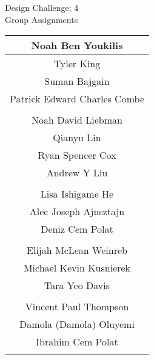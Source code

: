 \documentclass{article}
\begin{document}
\renewcommand{\arraystretch}{1.2} 
\begin{center}
{\Large Design Challenge: 4\\ 
Group Assignments} \\ 
\begin{tabular}{|c|} \hline 
Noah Ben Youkilis\\ \hline 
Tyler King\\ \hline 
Suman Bajgain\\ \hline 
Patrick Edward Charles Combe\\ \hline 
\multicolumn{1}{c}{\vspace{1mm}} \\ 
\hline 
Noah David Liebman\\ \hline 
Qianyu Lin\\ \hline 
Ryan Spencer Cox\\ \hline 
Andrew Y Liu\\ \hline 
\multicolumn{1}{c}{\vspace{1mm}} \\ 
\hline 
Lisa Ishigame He\\ \hline 
Alec Joseph Ajnsztajn\\ \hline 
Deniz Cem Polat\\ \hline 
\multicolumn{1}{c}{\vspace{1mm}} \\ 
\hline 
Elijah McLean Weinreb\\ \hline 
Michael Kevin Kusnierek\\ \hline 
Tara Yeo Davis\\ \hline 
\multicolumn{1}{c}{\vspace{1mm}} \\ 
\hline 
Vincent Paul Thompson\\ \hline 
Damola (Damola) Oluyemi\\ \hline 
Ibrahim Cem Polat\\ \hline 
\multicolumn{1}{c}{\vspace{1mm}} \\ 

\end{tabular} \\ 
\end{center}
\end{document}
